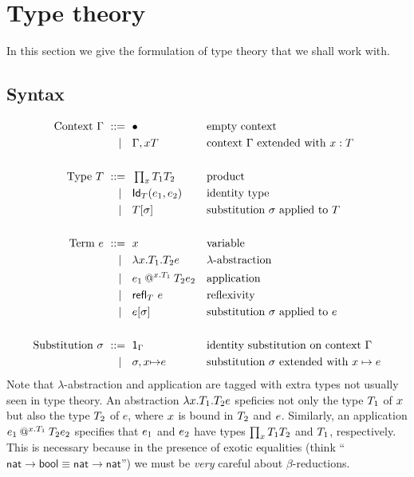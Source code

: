 \section{Type theory}
\label{sec:type-theory}

In this section we give the formulation of type theory that we shall work with.

\subsection{Syntax}
\label{sec:syntax}

\begin{align*}
  \text{Context $\Gamma$}
    \ \mathrel{{:}{:}{=}}\    {}& \bullet                         && \text{empty context} \\
    \ \mid\ \  {}& \Gamma, x{T}            && \text{context $\Gamma$ extended with $x : T$} \\
  \\
  \text{Type $T$}
    \ \mathrel{{:}{:}{=}}\    {}& \mathop{\textstyle\prod_{x}}{T_1} T_2               && \text{product}\\
    \ \mid\ \  {}& \mathsf{Id}_{T}(e_1,e_2)               && \text{identity type} \\
    \ \mid\ \  {}& T[\sigma]                  && \text{substitution $\sigma$ applied to $T$} \\
  \\
  \text{Term $e$}
    \ \mathrel{{:}{:}{=}}\    {}& x                                && \text{variable} \\
    \ \mid\ \  {}& \lambda x . T_1 .{T_2} e           && \text{$\lambda$-abstraction} \\
    \ \mid\ \  {}& e_1\mathbin{@^{x.T_1}} T_2{e_2}  && \text{application} \\
    \ \mid\ \  {}& {\mathsf{refl}_{T}}\  e                      && \text{reflexivity} \\
    \ \mid\ \  {}& e[\sigma]                  && \text{substitution $\sigma$ applied to $e$} \\
  \\
  \text{Substitution $\sigma$}
    \ \mathrel{{:}{:}{=}}\    {}& \mathsf{1}_{\Gamma}                   && \text{identity substitution on context $\Gamma$} \\
    \ \mid\ \  {}& \sigma,x{\mapsto}e           && \text{substitution $\sigma$ extended with $x \mapsto e$}
\end{align*}
%
Note that $\lambda$-abstraction and application are tagged with extra types not usually
seen in type theory. An abstraction $\lambda x . T_1 .{T_2} e$ speficies not only the type
$T_1$ of $x$ but also the type $T_2$ of $e$, where $x$ is bound in $T_2$ and $e$.
Similarly, an application $e_1\mathbin{@^{x.T_1}} T_2{e_2}$ specifies that $e_1$ and
$e_2$ have types $\mathop{\textstyle\prod_{x}}{T_1} T_2$ and $T_1$, respectively. This is necessary
because in the presence of exotic equalities (think ``$\mathsf{nat} \to \mathsf{bool}
\equiv \mathsf{nat} \to \mathsf{nat}$'') we must be \emph{very} careful about
$\beta$-reductions.

